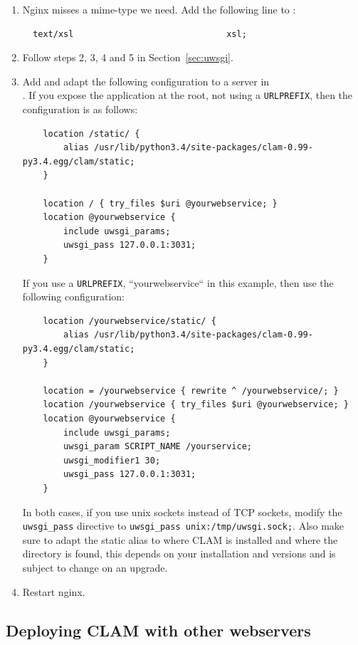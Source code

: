 \documentclass[a4paper,12pt,twoside,openright]{report}
\begin{document}
\begin{enumerate}[leftmargin=5mm]
\item Nginx misses a mime-type we need. Add the following
    line to :
{ \small
\begin{verbatim}
  text/xsl                              xsl;
\end{verbatim}
}

\item Follow steps 2, 3, 4 and 5 in Section~\ref{sec:uwsgi}.

\item Add and adapt the following configuration to a server in \\
    . If you expose the application at the
        root, not using a \texttt{URLPREFIX}, then the configuration is as
        follows:
{ \small
\begin{verbatim}
    location /static/ {
        alias /usr/lib/python3.4/site-packages/clam-0.99-py3.4.egg/clam/static;
    }

    location / { try_files $uri @yourwebservice; }
    location @yourwebservice {
        include uwsgi_params;
        uwsgi_pass 127.0.0.1:3031;
    }
\end{verbatim}
}
If you use a \texttt{URLPREFIX}, ``yourwebservice`` in this example, then
use the following configuration:
{ \small
\begin{verbatim}
    location /yourwebservice/static/ {
        alias /usr/lib/python3.4/site-packages/clam-0.99-py3.4.egg/clam/static;
    }

    location = /yourwebservice { rewrite ^ /yourwebservice/; }
    location /yourwebservice { try_files $uri @yourwebservice; }
    location @yourwebservice {
        include uwsgi_params;
        uwsgi_param SCRIPT_NAME /yourservice;
        uwsgi_modifier1 30;
        uwsgi_pass 127.0.0.1:3031;
    }
\end{verbatim}
}
In both cases, if you use unix sockets instead of TCP sockets, modify the \texttt{uwsgi\_pass} directive
to \texttt{uwsgi\_pass unix:/tmp/uwsgi.sock;}. Also make sure to adapt the static alias to where CLAM is
installed and where the  directory is found, this depends on your
installation and versions and is subject to change on an upgrade.
\item Restart nginx.
\end{enumerate}

\subsection{Deploying CLAM with other webservers}
\end{document}

